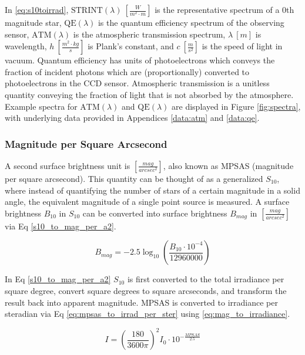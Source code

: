 In \ref{eq:s10toirrad}, $\textrm{STRINT}(\lambda) \: \left[ \frac{W}{m^2 \cdot m} \right]$ is the
representative spectrum of a 0th magnitude star, $\textrm{QE}(\lambda)$ is the quantum efficiency
spectrum of the observing sensor, $\textrm{ATM}(\lambda)$ is the atmospheric transmission spectrum, $\lambda \: [m]$ is wavelength, $h \: \left[
\frac{m^2 \cdot kg}{s} \right]$ is Plank's constant, and $c \: \left[ \frac{m}{s^2} \right]$ is the
speed of light in vacuum. Quantum efficiency has units of photoelectrons which conveys the fraction of incident photons which are (proportionally) converted to photoelectrons in the CCD sensor. Atmospheric transmission is a unitless quantity conveying the fraction of light that is not absorbed by the atmosphere. Example spectra for $\textrm{ATM}(\lambda)$ and $\textrm{QE}(\lambda)$ are displayed in Figure \ref{fig:spectra}, with underlying data provided in Appendices \ref{data:atm} and \ref{data:qe}.

\subsubsection{Magnitude per Square Arcsecond}

A second surface brightness unit is $\left[ \frac{mag}{arcsec^2} \right]$, also known as MPSAS (magnitude per square arcsecond). This quantity can be thought of as a generalized $S_{10}$, where instead of quantifying the number of stars of a certain
magnitude in a solid angle, the equivalent magnitude of a single point source is measured. A surface
brightness $B_{10}$ in $S_{10}$ can be converted into surface brightness $B_{mag}$ in 
$\left[ \frac{mag}{arcsec^2} \right]$ via Eq \ref{s10_to_mag_per_a2}.

\begin{equation} \label{s10_to_mag_per_a2}
	B_{mag} = -2.5 \log_{10}\left( \frac{B_{10} \cdot 10^{-4}}{12960000} \right)
\end{equation}

In Eq \ref{s10_to_mag_per_a2} $S_{10}$ is first converted to the total irradiance per square degree,
convert square degrees to square arcseconds, and transform the result back into apparent magnitude. MPSAS is converted to irradiance per steradian via Eq \ref{eq:mpsas_to_irrad_per_ster} using \ref{eq:mag_to_irradiance}.

\begin{equation} \label{eq:mpsas_to_irrad_per_ster}
  I = \left( \frac{180}{ 3600\pi} \right)^2 I_0 \cdot 10^{-\frac{MPSAS}{2.5}}
\end{equation}

